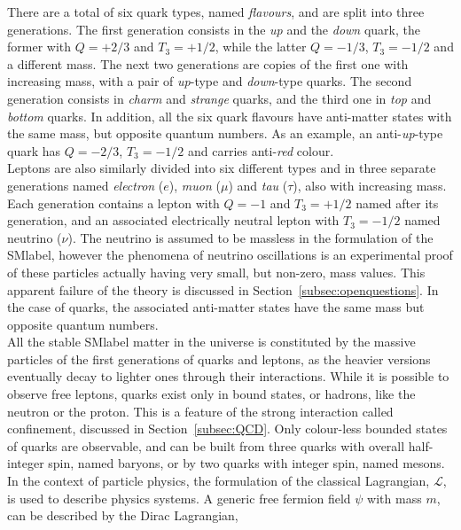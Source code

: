 There are a total of six quark types, named \textit{flavours}, and are split into three generations.
The first generation consists in the \textit{up} and the \textit{down} quark, the former with $Q=+2/3$ and $T_3=+1/2$,
while the latter $Q=-1/3$, $T_3=-1/2$ and a different mass.
The next two generations are copies of the first one with increasing mass, with a pair of \textit{up}-type and \textit{down}-type quarks.
The second generation consists in \textit{charm} and \textit{strange} quarks, and the third one in \textit{top} and \textit{bottom} quarks.
In addition, all the six quark flavours have anti-matter states with the same mass, but opposite quantum numbers. As an example,
an anti-\textit{up}-type quark has $Q=-2/3$, $T_3=-1/2$ and carries anti-\textit{red} colour.\\

Leptons are also similarly divided into six different types and in three separate generations named \textit{electron} ($e$), \textit{muon} ($\mu$) and \textit{tau} ($\tau$), also with increasing mass.
Each generation contains a lepton with $Q=-1$ and $T_3=+1/2$ named after its generation,
and an associated electrically neutral lepton with $T_3=-1/2$ named neutrino ($\nu$).
The neutrino is assumed to be massless in the formulation of the \acrshort{SMlabel},
however the phenomena of neutrino oscillations is an experimental proof of these particles actually having very small, but non-zero, mass values.
This apparent failure of the theory is discussed in Section~\ref{subsec:openquestions}. In the case of quarks, the associated anti-matter states have the same mass but opposite quantum numbers.\\

All the stable \acrshort{SMlabel} matter in the universe is constituted by the massive particles of the first generations of quarks and leptons, as the heavier versions eventually decay to lighter ones through their interactions. While it is possible to observe free leptons, quarks exist only in bound states, or hadrons, like the neutron or the proton. This is a feature of the strong interaction called confinement, discussed in Section~\ref{subsec:QCD}. Only colour-less bounded states of quarks are observable, and can be built from three quarks with overall half-integer spin, named baryons, or by two quarks with integer spin, named mesons.\\

In the context of particle physics, the formulation of the classical Lagrangian, $\mathcal{L}$, is used to describe physics systems.
A generic free fermion field $\psi$ with mass $m$, can be described by the Dirac Lagrangian, 

